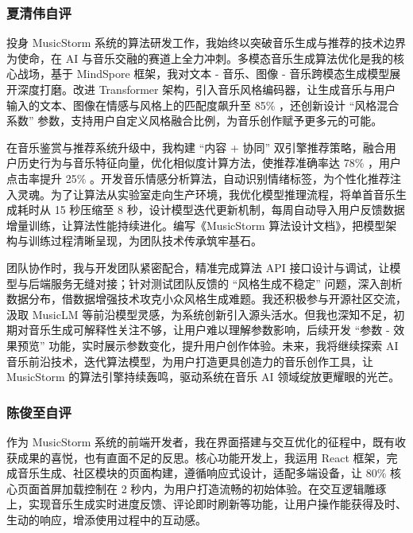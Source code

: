 \documentclass{base}
\numberwithin{figure}{section} %
\begin{document}
\vfill
\pagebreak
\clearpage
\thispagestyle{empty}
\null
\newpage

\subsubsection{夏清伟自评}

投身 MusicStorm 系统的算法研发工作，我始终以突破音乐生成与推荐的技术边界为使命，在 AI 与音乐交融的赛道上全力冲刺。多模态音乐生成算法优化是我的核心战场，基于 MindSpore 框架，我对文本 - 音乐、图像 - 音乐跨模态生成模型展开深度打磨。改进 Transformer 架构，引入音乐风格编码器，让生成音乐与用户输入的文本、图像在情感与风格上的匹配度飙升至 85\% ，还创新设计 “风格混合系数” 参数，支持用户自定义风格融合比例，为音乐创作赋予更多元的可能。

在音乐鉴赏与推荐系统升级中，我构建 “内容 + 协同” 双引擎推荐策略，融合用户历史行为与音乐特征向量，优化相似度计算方法，使推荐准确率达 78\% ，用户点击率提升 25\% 。开发音乐情感分析算法，自动识别情绪标签，为个性化推荐注入灵魂。为了让算法从实验室走向生产环境，我优化模型推理流程，将单首音乐生成耗时从 15 秒压缩至 8 秒，设计模型迭代更新机制，每周自动导入用户反馈数据增量训练，让算法性能持续进化。编写《MusicStorm 算法设计文档》，把模型架构与训练过程清晰呈现，为团队技术传承筑牢基石。

团队协作时，我与开发团队紧密配合，精准完成算法 API 接口设计与调试，让模型与后端服务无缝对接；针对测试团队反馈的 “风格生成不稳定” 问题，深入剖析数据分布，借数据增强技术攻克小众风格生成难题。我还积极参与开源社区交流，汲取 MusicLM 等前沿模型灵感，为系统创新引入源头活水。但我也深知不足，初期对音乐生成可解释性关注不够，让用户难以理解参数影响，后续开发 “参数 - 效果预览” 功能，实时展示参数变化，提升用户创作体验。未来，我将继续探索 AI 音乐前沿技术，迭代算法模型，为用户打造更具创造力的音乐创作工具，让 MusicStorm 的算法引擎持续轰鸣，驱动系统在音乐 AI 领域绽放更耀眼的光芒。

\vfill
\pagebreak
\clearpage
\thispagestyle{empty}
\null
\newpage

\subsubsection{陈俊至自评}

作为 MusicStorm 系统的前端开发者，我在界面搭建与交互优化的征程中，既有收获成果的喜悦，也有直面不足的反思。核心功能开发上，我运用 React 框架，完成音乐生成、社区模块的页面构建，遵循响应式设计，适配多端设备，让 80\% 核心页面首屏加载控制在 2 秒内，为用户打造流畅的初始体验。在交互逻辑雕琢上，实现音乐生成实时进度反馈、评论即时刷新等功能，让用户操作能获得及时、生动的响应，增添使用过程中的互动感。
\end{document}
